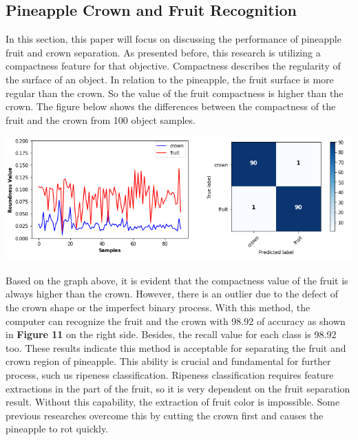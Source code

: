 \documentclass[11pt]{article}
\begin{document}
\begin{linenumbers}
\subsection{Pineapple Crown and Fruit Recognition}
In this section, this paper will focus on discussing the performance of pineapple fruit and crown separation. As presented before, this research is utilizing a compactness feature for that objective. Compactness describes the regularity of the surface of an object. In relation to the pineapple, the fruit surface is more regular than the crown. So the value of the fruit compactness is higher than the crown. The figure below shows the differences between the compactness of the fruit and the crown from 100 object samples.
\begin{center}
	\includegraphics[scale=0.8]{images/sparation-result}
\end{center}

Based on the graph above, it is evident that the compactness value of the fruit is always higher than the crown. However, there is an outlier due to the defect of the crown shape or the imperfect binary process. With this method, the computer can recognize the fruit and the crown with 98.92\text{\%} of accuracy as shown in \textbf{Figure 11} on the right side. Besides, the recall value for each class is 98.92\text{\%} too. These results indicate this method is acceptable for separating the fruit and crown region of pineapple. This ability is crucial and fundamental for further process, such us ripeness classification. Ripeness classification requires feature extractions in the part of the fruit, so it is very dependent on the fruit separation result. Without this capability, the extraction of fruit color is impossible. Some previous researches overcome this by cutting the crown first and causes the pineapple to rot quickly.


\end{linenumbers}
\end{document}
